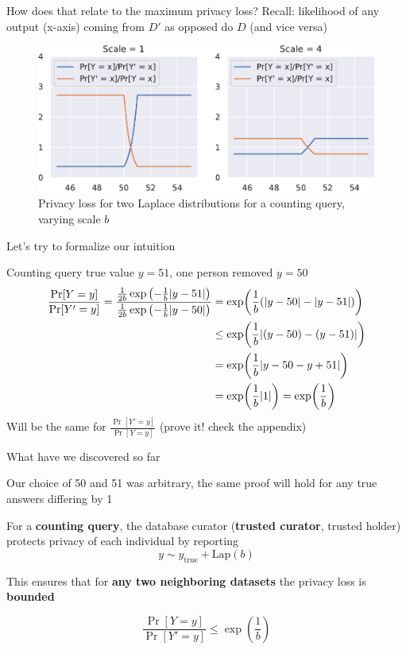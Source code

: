 \documentclass[12pt,aspectratio=169,handout]{beamer}
\begin{document}
\begin{frame}{How does that relate to the maximum privacy loss?}
Recall: likelihood of any output (x-axis) coming from $D'$ as opposed do $D$ (and vice versa)

\begin{figure}
\centering
\includegraphics[width=0.8\linewidth]{img/privacy-loss1.pdf}
\caption{Privacy loss for two Laplace distributions for a counting query, varying scale $b$}
\end{figure}

\end{frame}



\begin{frame}{Let's try to formalize our intuition}
\label{slide:proof.reference}

Counting query true value $y= 51$, one person removed $y = 50$
$$
\begin{aligned}
\frac{\Pr[Y = y]}{\Pr[Y' = y]} =
\frac{
\frac{1}{2b} \exp \left(- \frac{1}{b} \abs{y - 51} \right)
}{
\frac{1}{2b} \exp \left(- \frac{1}{b} \abs{y - 50} \right) 
}
&= \exp (\frac{1}{b} ( \abs{y - 50} - \abs{y - 51} ) ) \\
&\leq \exp (\frac{1}{b} \abs{(y - 50) - (y - 51)} ) \\
&= \exp (\frac{1}{b} \abs{y - 50 - y + 51} ) \\
&= \exp (\frac{1}{b} \abs{1}) = \exp(\frac{1}{b}) \\
\end{aligned}
$$
Will be the same for $\frac{\Pr[Y' = y]}{\Pr[Y = y]}$ (prove it! check the appendix)

\end{frame}







\begin{frame}{What have we discovered so far}

Our choice of 50 and 51 was arbitrary, the same proof will hold for any true answers differing by 1

For a \textbf{counting query}, the database curator (\textbf{trusted curator}, trusted holder) protects privacy of each individual by reporting
$$y \sim y_{\mathrm{true}} + \textrm{Lap}(b)$$

This ensures that for \textbf{any two neighboring datasets} the privacy loss is \textbf{bounded}

$$
\frac{\Pr[Y = y]}{\Pr[Y' = y]} \leq \exp(\frac{1}{b})
$$

\end{frame}
\end{document}

